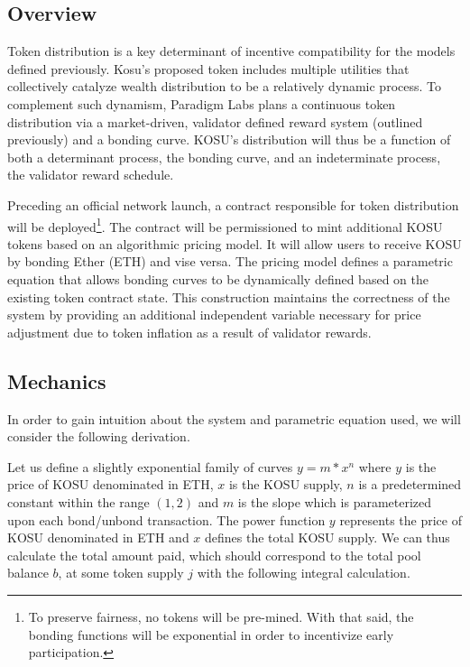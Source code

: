 \documentclass[10pt]{article}
\begin{document}
\subsection{Overview}\label{token-distribution-overview}
Token distribution is a key determinant of incentive compatibility for the models defined previously. Kosu’s proposed token includes multiple utilities that collectively catalyze wealth distribution to be a relatively dynamic process. To complement such dynamism, Paradigm Labs plans a continuous token distribution via a market-driven, validator defined reward system (outlined previously) and a bonding curve. KOSU’s distribution will thus be a function of both a determinant process, the bonding curve, and an indeterminate process, the validator reward schedule.
\medskip

Preceding an official network launch, a contract responsible for token distribution will be deployed\footnote{To preserve fairness, no tokens will be pre-mined. With that said, the bonding functions will be exponential in order to incentivize early participation.}. The contract will be permissioned to mint additional KOSU tokens based on an algorithmic pricing model. It will allow users to receive KOSU by bonding Ether (ETH) and vise versa. The pricing model defines a parametric equation that allows bonding curves to be dynamically defined based on the existing token contract state. This construction maintains the correctness of the system by providing an additional independent variable necessary for price adjustment due to token inflation as a result of validator rewards.

\subsection{Mechanics}\label{token-distribution-mechanics}
In order to gain intuition about the system and parametric equation used, we will consider the following derivation.
\medskip

Let us define a slightly exponential family of curves $ y = m*x^n $ where $y$ is the price of KOSU denominated in ETH, $x$ is the KOSU supply, $n$ is a predetermined constant within the range $(1,2)$ and $m$ is the slope which is parameterized upon each bond/unbond transaction. The power function $y$ represents the price of KOSU denominated in ETH and $x$ defines the total KOSU supply. We can thus calculate the total amount paid, which should correspond to the total pool balance $b$, at some token supply $j$ with the following integral calculation.
\end{document}

